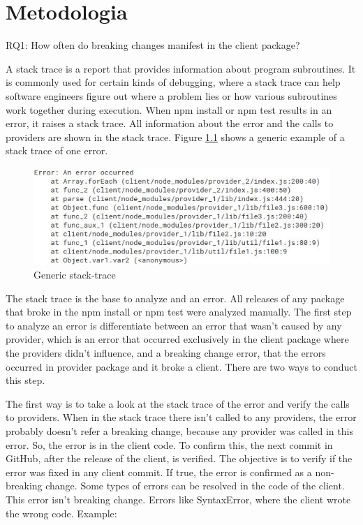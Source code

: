 \chapter{Metodologia}
\label{cap:metodologia}

RQ1: How often do breaking changes manifest in the client package?

A stack trace is a report that provides information about program subroutines. It is commonly used for certain kinds of debugging, where a stack trace can help software engineers figure out where a problem lies or how various subroutines work together during execution. When npm install or npm test results in an error, it raises a stack trace. All information about the error and the calls to providers are shown in the stack trace. Figure \ref{fig:trace} shows a generic example of a stack trace of one error.

\begin{figure}
    \centering
    \includegraphics[scale=0.7]{figuras/stack_trace.jpeg}
    \caption{Generic stack-trace}
    \label{fig:trace}
\end{figure}{}

The stack trace is the base to analyze and an error.
All releases of any package that broke in the npm install or npm test were analyzed manually. The first step to analyze an error is differentiate between an error that wasn't caused by any provider, which is an error that occurred exclusively in the client package where the providers didn’t influence, and a breaking change error, that the errors occurred in provider package and it broke a client. There are two ways to conduct this step.

The first way is to take a look at the stack trace of the error and verify the calls to providers. When in the stack trace there isn't called to any providers, the error probably doesn’t refer a breaking change, because any provider was called in this error. So, the error is in the client code. To confirm this, the next commit in GitHub, after the release of the client, is verified. The objective is to verify if the error was fixed in any client commit. If true, the error is confirmed as a non-breaking change.
Some types of errors can be resolved in the code of the client. This error isn’t breaking change. Errors like SyntaxError, where the client wrote the wrong code. Example:

